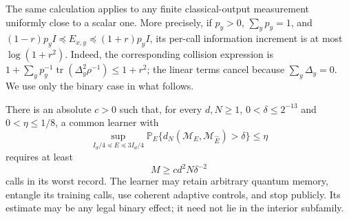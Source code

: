 The same calculation applies to any finite classical-output
measurement uniformly close to a scalar one.  More precisely, if
$p_y>0$, $\sum_y p_y=1$, and
$(1-r)p_yI\preceq E_{x,y}\preceq(1+r)p_yI$, its per-call
information increment is at most $\log(1+r^2)$.  Indeed, the
corresponding collision expression is
$1+\sum_y p_y^{-1}\operatorname{tr}(\Delta_y^2\rho^{-1})
\le1+r^2$; the linear terms cancel because $\sum_y\Delta_y=0$.
We use only the binary case in what follows.

\begin{theorem}
\label{thm:dimensionlower78}
There is an absolute $c>0$ such that, for every $d,N\ge1$,
$0<\delta\le2^{-13}$ and $0<\eta\le1/8$, a common learner with
\[
 \sup_{I_d/4\preceq E\preceq3I_d/4}
 \mathbb P_E\{d_N(\mathcal M_E,\mathcal M_{\widehat E})>\delta\}
 \le\eta
\]
requires at least
\begin{equation}\label{eq:dimensionlower78}
 M\ge c d^2N\delta^{-2}
\end{equation}
calls in its worst record.  The learner may retain arbitrary quantum
memory, entangle its training calls, use coherent adaptive controls,
and stop publicly.  Its estimate may be any legal binary effect;
it need not lie in the interior subfamily.
\end{theorem}
